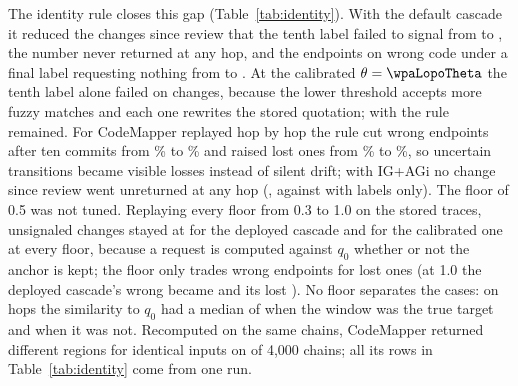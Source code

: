 

The identity rule closes this gap (Table~\ref{tab:identity}). With the default cascade it reduced the changes since review that the tenth label failed to signal from \wiChIOffMissLastTenK{} to \wiChIOffIdMissLastTenK{}, the number never returned at any hop, and the endpoints on wrong code under a final label requesting nothing from \wiChIOffSilentLastTenK{} to \wiChIOffIdSilentLastTenK{}. At the calibrated $\theta=\wpaLopoTheta$ the tenth label alone failed on \wiChICaliMissLastTenK{} changes, because the lower threshold accepts more fuzzy matches and each one rewrites the stored quotation; with the rule \wiChICaliIdMissLastTenK{} remained. For CodeMapper replayed hop by hop the rule cut wrong endpoints after ten commits from \wiChICmSeqWrongTen\% to \wiChICmSeqIdWrongTen\% and raised lost ones from \wiChICmSeqLostTen\% to \wiChICmSeqIdLostTen\%, so uncertain transitions became visible losses instead of silent drift; with IG+AGi no change since review went unreturned at any hop (\wiChICmSeqGiMissCumTenK{}, against \wiChICmSeqMissCumTenK{} with labels only). The floor of 0.5 was not tuned. Replaying every floor from 0.3 to 1.0 on the stored traces, unsignaled changes stayed at \wzDepMissRange{} for the deployed cascade and \wzGicMissRange{} for the calibrated one at every floor, because a request is computed against $q_0$ whether or not the anchor is kept; the floor only trades wrong endpoints for lost ones (at 1.0 the deployed cascade's \wzDepFFiveWrong{} wrong became \wzDepFTenWrong{} and its \wzDepFFiveLost{} lost \wzDepFTenLost). No floor separates the cases: on  hops the similarity to $q_0$ had a median of \wzDepRatioTrueMed{} when the window was the true target and \wzDepRatioWrongMed{} when it was not. Recomputed on the same chains, CodeMapper returned different regions for identical inputs on \wiChIGateChains{} of 4,000 chains; all its rows in Table~\ref{tab:identity} come from one run.



